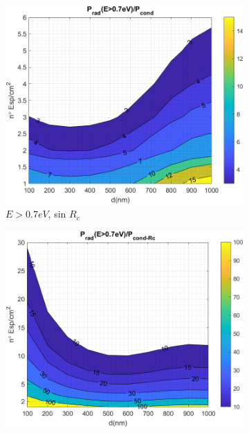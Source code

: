 \begin{figure}[H]
	\centering
	\begin{subfigure}[b]{0.49\textwidth}
		\centering
		\includegraphics[width=1.00\textwidth]{figuras/Resultados/RelacionCondRad/SiGe.png}
		\caption{$E>0.7eV$, sin $R_c$}
		\label{fig:rel_SiSiO2Ge}
	\end{subfigure}
	\hfill
	\begin{subfigure}[b]{0.49\textwidth}
			\centering
			\includegraphics[width=1.00\textwidth]{figuras/Resultados/RelacionCondRad/SiGe_Rc.png}

\end{subfigure}
\end{figure}

